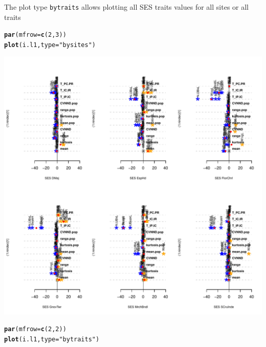 \documentclass[12pt]{article}\usepackage[]{graphicx}\usepackage[]{color}
\makeatletter
\def\maxwidth{ %
  \ifdim\Gin@nat@width>\linewidth
    \linewidth
  \else
    \Gin@nat@width
  \fi
}
\newcommand{\hlnum}[1]{\textcolor[rgb]{0.686,0.059,0.569}{#1}}%
\newcommand{\hlstr}[1]{\textcolor[rgb]{0.192,0.494,0.8}{#1}}%
\newcommand{\hlstd}[1]{\textcolor[rgb]{0.345,0.345,0.345}{#1}}%
\newcommand{\hlkwc}[1]{\textcolor[rgb]{0.333,0.667,0.333}{#1}}%
\newcommand{\hlkwd}[1]{\textcolor[rgb]{0.737,0.353,0.396}{\textbf{#1}}}%
\newenvironment{kframe}{%
 \def\at@end@of@kframe{}%
 \ifinner\ifhmode%
  \def\at@end@of@kframe{\end{minipage}}%
  \begin{minipage}{\columnwidth}%
 \fi\fi%
 \def\FrameCommand##1{\hskip\@totalleftmargin \hskip-\fboxsep
 \colorbox{shadecolor}{##1}\hskip-\fboxsep
     \hskip-\linewidth \hskip-\@totalleftmargin \hskip\columnwidth}%
 \MakeFramed {\advance\hsize-\width
   \@totalleftmargin\z@ \linewidth\hsize
   \@setminipage}}%
 {\par\unskip\endMakeFramed%
 \at@end@of@kframe}
\newenvironment{knitrout}{}{} %
\makeatother
\begin{document}
The plot type \texttt{bytraits} allows plotting all SES traits values for all sites or all traits
\begin{knitrout}
\color{fgcolor}\begin{kframe}
\begin{alltt}
\hlkwd{par}\hlstd{(}\hlkwc{mfrow} \hlstd{=} \hlkwd{c}\hlstd{(}\hlnum{2}\hlstd{,}\hlnum{3}\hlstd{))}
\hlkwd{plot}\hlstd{(i.l1,}\hlkwc{type} \hlstd{=} \hlstr{"bysites"}\hlstd{)}
\end{alltt}
\end{kframe}
\includegraphics[width=\maxwidth]{figure/unnamed-chunk-501} 
\begin{kframe}\begin{alltt}
\hlkwd{par}\hlstd{(}\hlkwc{mfrow} \hlstd{=} \hlkwd{c}\hlstd{(}\hlnum{2}\hlstd{,}\hlnum{2}\hlstd{))}
\hlkwd{plot}\hlstd{(i.l1,}\hlkwc{type} \hlstd{=} \hlstr{"bytraits"}\hlstd{)}
\end{alltt}
\end{kframe}

\end{knitrout}
\end{document}

